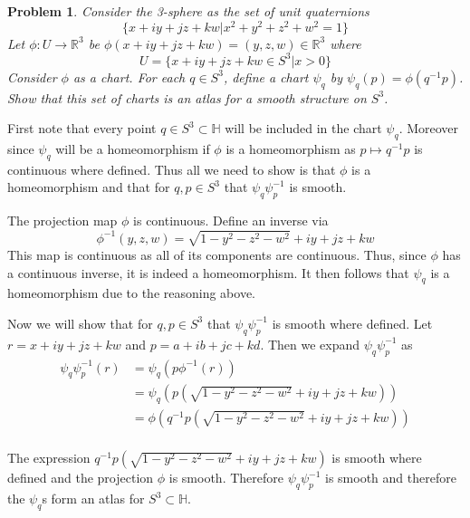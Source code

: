 \documentclass[10pt]{article}
\newcommand{\sk}{\vskip 10mm}
\newcommand{\bb}[1]{\mathbb{#1}}
\theoremstyle{plain}
\newtheorem{problem}{Problem}
\theoremstyle{remark}
\begin{document}
\begin{problem}
  Consider the 3-sphere as the set of unit quaternions
  \[ \{x+iy+jz+kw|x^2+y^2+z^2+w^2=1\} \]
  Let $\phi:U\rightarrow\bb{R}^3$ be $\phi(x+iy+jz+kw)=(y,z,w)\in\bb{R}^3$ where
  \[ U=\{x+iy+jz+kw\in S^3|x>0\} \]
  Consider $\phi$ as a chart. For each $q\in S^3$, define a chart $\psi_q$ by
  $\psi_q(p)=\phi(q^{-1}p)$. Show that this set of charts is an atlas for a
  smooth structure on $S^3$.
\end{problem}

First note that every point $q\in S^3\subset\bb{H}$ will be included
in the chart $\psi_q$. Moreover since $\psi_q$ will be a homeomorphism
if $\phi$ is a homeomorphism as $p\mapsto q^{-1}p$ is continuous where defined.
Thus all we need to show is that $\phi$ is 
a homeomorphism and that for $q,p\in S^3$ that $\psi_q\psi_p^{-1}$ is smooth.

The projection map $\phi$ is continuous. Define an inverse via
\[ \phi^{-1}(y,z,w)=\sqrt{1-y^2-z^2-w^2}+iy+jz+kw \]
This map is continuous as all of its components are continuous. Thus,
since $\phi$ has a continuous inverse, it is indeed a homeomorphism.
It then follows that $\psi_q$ is a homeomorphism due to the reasoning above.

Now we will show that for $q,p\in S^3$ that $\psi_q\psi_p^{-1}$ is smooth where
defined. Let $r=x+iy+jz+kw$ and $p=a+ib+jc+kd$.
Then we expand $\psi_q\psi_p^{-1}$ as
\begin{align*}
  \psi_q\psi_p^{-1}(r)&=\psi_q(p\phi^{-1}(r))\\
                &= \psi_q(p(\sqrt{1-y^2-z^2-w^2}+iy+jz+kw))\\
                &= \phi(q^{-1}p(\sqrt{1-y^2-z^2-w^2}+iy+jz+kw))\\
\end{align*}

The expression $q^{-1}p(\sqrt{1-y^2-z^2-w^2}+iy+jz+kw)$ is smooth where defined
and the projection $\phi$ is smooth. Therefore $\psi_q\psi_p^{-1}$ is smooth and
therefore the $\psi_q$s form an atlas for $S^3\subset\bb{H}$.

\sk
\end{document}
